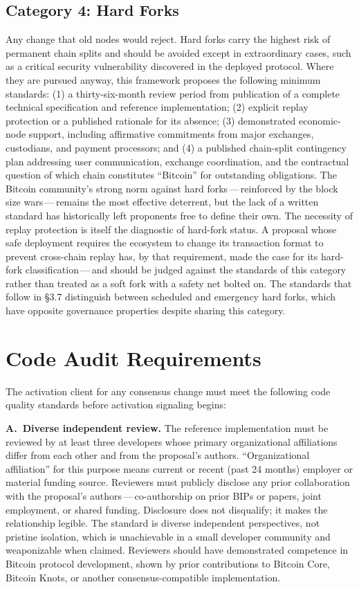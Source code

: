 \documentclass[11pt, twoside, openright]{book}
\newcommand{\reqitem}[2]{\medskip\noindent\textbf{#1\ #2}\quad\ignorespaces}
\newcommand{\sect}[1]{\S#1}
\begin{document}
\subsection*{Category 4: Hard Forks}

Any change that old nodes would reject. Hard forks carry the highest risk of permanent chain splits and should be avoided except in extraordinary cases, such as a critical security vulnerability discovered in the deployed protocol. Where they are pursued anyway, this framework proposes the following minimum standards: (1) a thirty-six-month review period from publication of a complete technical specification and reference implementation; (2) explicit replay protection or a published rationale for its absence; (3) demonstrated economic-node support, including affirmative commitments from major exchanges, custodians, and payment processors; and (4) a published chain-split contingency plan addressing user communication, exchange coordination, and the contractual question of which chain constitutes ``Bitcoin'' for outstanding obligations. The Bitcoin community's strong norm against hard forks\,---\,reinforced by the block size wars\,---\,remains the most effective deterrent, but the lack of a written standard has historically left proponents free to define their own. The necessity of replay protection is itself the diagnostic of hard-fork status. A proposal whose safe deployment requires the ecosystem to change its transaction format to prevent cross-chain replay has, by that requirement, made the case for its hard-fork classification\,---\,and should be judged against the standards of this category rather than treated as a soft fork with a safety net bolted on. The standards that follow in \sect{3.7} distinguish between scheduled and emergency hard forks, which have opposite governance properties despite sharing this category.

\section{Code Audit Requirements}

The activation client for any consensus change must meet the following code quality standards before activation signaling begins:

\reqitem{A.}{Diverse independent review.} The reference implementation must be reviewed by at least three developers whose primary organizational affiliations differ from each other and from the proposal's authors. ``Organizational affiliation'' for this purpose means current or recent (past 24 months) employer or material funding source. Reviewers must publicly disclose any prior collaboration with the proposal's authors\,---\,co-authorship on prior BIPs or papers, joint employment, or shared funding. Disclosure does not disqualify; it makes the relationship legible. The standard is diverse independent perspectives, not pristine isolation, which is unachievable in a small developer community and weaponizable when claimed. Reviewers should have demonstrated competence in Bitcoin protocol development, shown by prior contributions to Bitcoin Core, Bitcoin Knots, or another consensus-compatible implementation.
\end{document}
